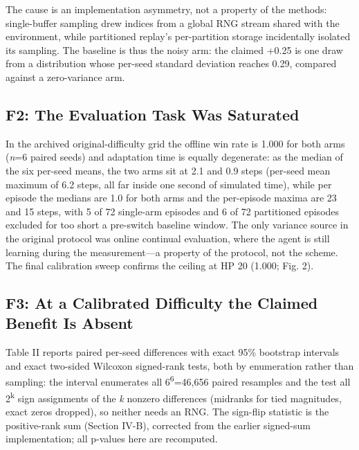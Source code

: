 \documentclass[conference,9pt]{IEEEtran}
\begin{document}
The cause is an implementation asymmetry, not a property of the methods: single-buffer sampling drew indices from a global RNG stream shared with the environment, while partitioned replay's per-partition storage incidentally isolated its sampling. The baseline is thus the noisy arm: the claimed +0.25 is one draw from a distribution whose per-seed standard deviation reaches 0.29, compared against a zero-variance arm.

\subsection{F2: The Evaluation Task Was Saturated}

In the archived original-difficulty grid the offline win rate is 1.000 for both arms (\textit{n}=6 paired seeds) and adaptation time is equally degenerate: as the median of the six per-seed means, the two arms sit at 2.1 and 0.9 steps (per-seed mean maximum of 6.2 steps, all far inside one second of simulated time), while per episode the medians are 1.0 for both arms and the per-episode maxima are 23 and 15 steps, with 5 of 72 single-arm episodes and 6 of 72 partitioned episodes excluded for too short a pre-switch baseline window. The only variance source in the original protocol was online continual evaluation, where the agent is still learning during the measurement---a property of the protocol, not the scheme. The final calibration sweep confirms the ceiling at HP 20 (1.000; Fig. 2).

\subsection{F3: At a Calibrated Difficulty the Claimed Benefit Is Absent}

Table II reports paired per-seed differences with exact 95\% bootstrap intervals and exact two-sided Wilcoxon signed-rank tests, both by enumeration rather than sampling: the interval enumerates all 6\textsuperscript{6}=46,656 paired resamples and the test all 2\textsuperscript{k} sign assignments of the \textit{k} nonzero differences (midranks for tied magnitudes, exact zeros dropped), so neither needs an RNG. The sign-flip statistic is the positive-rank sum (Section IV-B), corrected from the earlier signed-sum implementation; all p-values here are recomputed.
\end{document}
